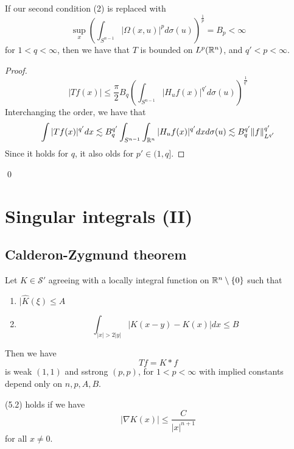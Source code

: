\begin{note}
    If our second condition (2) is replaced with 
    \begin{equation*}
        \sup_x\left(\int_{S^{n-1}}|\Omega(x,u)|^pd\sigma(u)\right)^{\frac{1}{p}}=B_p<\infty
    \end{equation*}
    for $1<q<\infty$, then we have that $T$ is bounded on $L^p(\mathbb{R}^n)$, and $q'<p<\infty$.
\end{note}
\begin{proof}
    \begin{equation*}
        |Tf(x)|\leq\frac{\pi}{2}B_q\left(\int_{S^{n-1}}|H_uf(x)|^{q'}d\sigma(u)\right)^\frac{1}{q'}
    \end{equation*}
    Interchanging the order, we have that
    \begin{equation*}
        \int |Tf(x)|^{q'}dx\lesssim B_q^{q'}\int_{S^{n-1}}\int_{\mathbb{R}^n}|H_uf(x)|^{q'}dxd\sigma(u)\lesssim B_q^{q'}\|f\|_{L^{q'}}^{q'}
    \end{equation*}
    Since it holds for $q$, it also olds for $p'\in (1,q]$.
\end{proof}
\qed

\chapter{Singular integrals (II)}

\section{Calderon-Zygmund theorem}
\begin{theorem}
    Let $K\in\mathcal{S}'$ agreeing with a locally integral function on $\mathbb{R}^n\setminus\{0\}$ such that 
    \begin{enumerate}
        \item $|\hat{K}(\xi)\leq A$
        \item \begin{equation*}
            \int_{|x|>2|y|}|K(x-y)-K(x)|dx\leq B
        \end{equation*}
    \end{enumerate}
    Then we have 
    \begin{equation*}
        Tf=K\ast f
    \end{equation*}
    is weak $(1,1)$ and sstrong $(p,p)$, for $1<p<\infty$ with implied constants depend only on $n, p, A, B$.
\end{theorem}
\begin{proposition}
    (5.2) holds if we have
    \begin{equation*}
        |\nabla K(x)|\leq\frac{C}{|x|^{n+1}}
    \end{equation*}
    for all $x\neq 0$.
\end{proposition}
